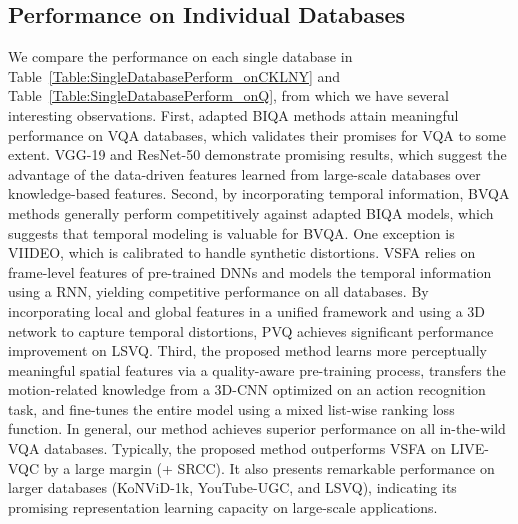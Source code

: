 \documentclass[journal]{IEEEtran}
\begin{document}
{{\subsection{Performance on Individual Databases}\label{subsec:IndividualExp}
We compare the performance on each single database in Table~\ref{Table:SingleDatabasePerform_onCKLNY} and Table~\ref{Table:SingleDatabasePerform_onQ}, from which we have several interesting observations. First, adapted BIQA methods attain meaningful performance on VQA databases, which validates their promises for VQA to some extent. VGG-19 and ResNet-50 demonstrate promising results, which suggest the advantage of the data-driven features learned from large-scale databases over knowledge-based features. Second, by incorporating temporal information, BVQA methods generally perform competitively against adapted BIQA models, which suggests that temporal modeling is valuable for BVQA. One exception is VIIDEO, which is calibrated to handle synthetic distortions. VSFA relies on frame-level features of pre-trained DNNs and models the temporal information using a RNN, yielding competitive performance on all databases. By incorporating local and global features in a unified framework and using a 3D network to capture temporal distortions, PVQ achieves significant performance improvement on LSVQ. Third, the proposed method learns more perceptually meaningful spatial features via a quality-aware pre-training process, transfers the motion-related knowledge from a 3D-CNN optimized on an action recognition task, and fine-tunes the entire model using a mixed list-wise ranking loss function. In general, our method achieves superior performance on all in-the-wild VQA databases. Typically, the proposed method outperforms VSFA on LIVE-VQC by a large margin (+ SRCC). It also presents remarkable performance on larger databases (KoNViD-1k, YouTube-UGC, and LSVQ), indicating its promising representation learning capacity on large-scale applications.

\begin{table}[!htbp]
	\centering
	\caption{Median SRCC and PLCC results under the mixed databases training setting}
\end{table}}}
\end{document}
